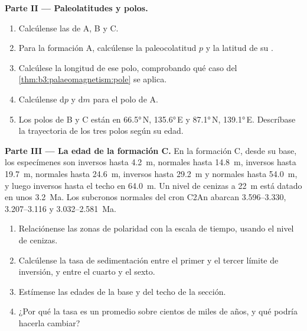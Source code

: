 \begin{problem}
\medskip\noindent\textbf{Parte II --- Paleolatitudes y polos.}
\begin{enumerate}[resume]
  \item Calcúlense las  de A, B y C.
  \item Para la formación A, calcúlense la paleocolatitud $p$ y la latitud de
        su .
  \item Calcúlese la longitud de ese polo, comprobando qué caso del
        \cref{thm:b3:palaeomagnetism:pole} se aplica.
  \item Calcúlense $\mathrm dp$ y $\mathrm dm$ para el polo de A.
  \item Los polos de B y C están en \ang{66.5}\,N, \ang{135.6}\,E y
        \ang{87.1}\,N, \ang{139.1}\,E. Descríbase la trayectoria de los tres polos
        según su edad.
\end{enumerate}

\medskip\noindent\textbf{Parte III --- La edad de la formación C.} En la formación C,
desde su base, los especímenes son inversos hasta \qty{4.2}{m}, normales hasta
\qty{14.8}{m}, inversos hasta \qty{19.7}{m}, normales hasta \qty{24.6}{m}, inversos hasta
\qty{29.2}{m} y normales hasta \qty{54.0}{m}, y luego inversos hasta el techo en
\qty{64.0}{m}. Un nivel de cenizas a \qty{22}{m} está datado en unos \qty{3.2}{Ma}. Los
subcronos normales del cron C2An abarcan 3.596--3.330, 3.207--3.116 y
3.032--\qty{2.581}{Ma}.
\begin{enumerate}[resume]
  \item Relaciónense las zonas de polaridad con la escala de tiempo, usando el nivel de cenizas.
  \item Calcúlense la tasa de sedimentación entre el primer y el tercer límite
        de inversión, y entre el cuarto y el sexto.
  \item Estímense las edades de la base y del techo de la sección.
  \item ¿Por qué la tasa es un promedio sobre cientos de miles de años, y qué
        podría hacerla cambiar?
\end{enumerate}


\end{problem}
